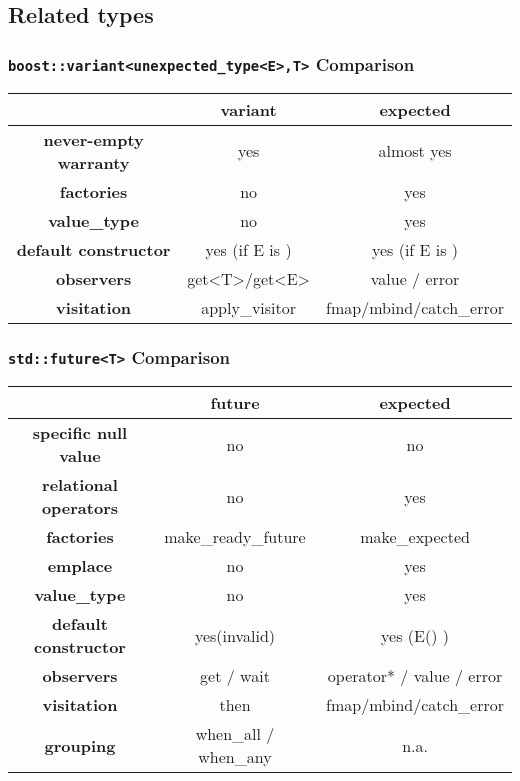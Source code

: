 \documentclass[xcolor=dvipsnames]{beamer}
\newcommand{\cpp}[1]{\lstinline{#1}}
\begin{document}
\subsection{Related types}

\begin{frame}[fragile]
\frametitle{\cpp{boost::variant<unexpected_type<E>,T>} Comparison}

\begin{tabular}{|c|c|c|}
\hline
                    & \textbf{variant} & \textbf{expected}  \\
\hline
\textbf{never-empty warranty} & yes & almost yes \\
\hline
\textbf{factories} & no & yes  \\
\hline
\textbf{value\_type} & no & yes  \\
\hline
\textbf{default constructor} & yes (if E is ) & yes (if E is )  \\
\hline
\textbf{observers} & get<T>/get<E> & value / error   \\
\hline
\textbf{visitation} & apply\_visitor & fmap/mbind/catch\_error  \\
\hline
\end{tabular}
\end{frame}

\begin{frame}[fragile]
\frametitle{\cpp{std::future<T>} Comparison}

\begin{tabular}{|c|c|c|}
\hline
                    & \textbf{future} & \textbf{expected}  \\
\hline
\textbf{specific null value} & no & no \\
\hline
\textbf{relational operators} & no & yes \\
\hline
\textbf{factories} & make\_ready\_future & make\_expected  \\
\hline
\textbf{emplace} & no & yes \\
\hline
\textbf{value\_type} & no & yes  \\
\hline
\textbf{default constructor} & yes(invalid) & yes (E() )  \\
\hline
\textbf{observers} & get / wait & operator* / value / error   \\
\hline
\textbf{visitation} & then & fmap/mbind/catch\_error  \\
\hline
\textbf{grouping}  &  when\_all / when\_any &  n.a. \\
\hline
\end{tabular}
\end{frame}
\end{document}
